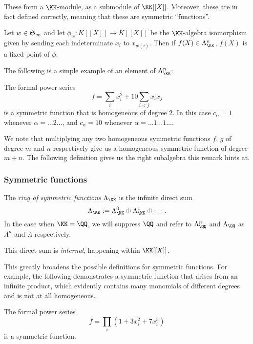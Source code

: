 \documentclass{article}
\newcommand{\frkS}{\ensuremath\mathfrak{S}}
\begin{document}
These form a $\KK$-module, as a submodule of $\KK[[X]]$.
Moreover, these are in fact defined correctly, meaning that these are symmetric ``functions''.

\begin{remark}
    Let $w \in \frkS_\infty$ and let $\phi_w: K[[X]] \to K[[X]]$ be the $\KK$-algebra isomorphism given by sending each indeterminate $x_i$ to $x_{w(i)}$.
    Then if $f(X) \in \Lambda_\KK^n$, $f(X)$ is a fixed point of $\phi$.
\end{remark}

The following is a simple example of an element of $\Lambda_\KK^n$:

\begin{example}
    The formal power series 
    \[
        f = \sum_i x_i^2 + 10\sum_{i < j} x_ix_j
    \]
    is a symmetric function that is homogeneous of degree $2$. In this case $c_\alpha = 1$ whenever $\alpha = \ldots 2 \ldots$, and $c_\alpha = 10$ whenever $\alpha = \ldots 1 \ldots 1 \ldots$. 
\end{example}


We note that multiplying any two homogeneous symmetric functions $f$, $g$ of degree $m$ and $n$ respectively give us a homogeneous symmetric function of degree $m+n$.
The following definition gives us the right subalgebra this remark hints at.

\subsubsection{Symmetric functions}

\begin{definition}
    The \textit{ring of symmetric functions} $\Lambda_\KK$ is the infinite direct sum
    \[
        \Lambda_\KK := \Lambda_\KK^0 \oplus\Lambda_\KK^1 \oplus \cdots.
    \]
    In the case when $\KK = \QQ$, we will suppress $\QQ$ and refer to $\Lambda_\QQ^n$ and $\Lambda_\QQ$ as $\Lambda^n$ and $\Lambda$ respectively.
\end{definition}

This direct sum is \textit{internal}, happening within $\KK[[X]]$. 

This greatly broadens the possible definitions for symmetric functions. 
For example, the following demonstrates a symmetric function that arises from an infinite product, which evidently contains many monomials of different degrees and is not at all homogeneous.

\begin{example}
    The formal power series 
    \[
        f = \prod_i (1 + 3x_i^2 + 7x_i^5)
    \]
    is a symmetric function.
\end{example}
\end{document}
